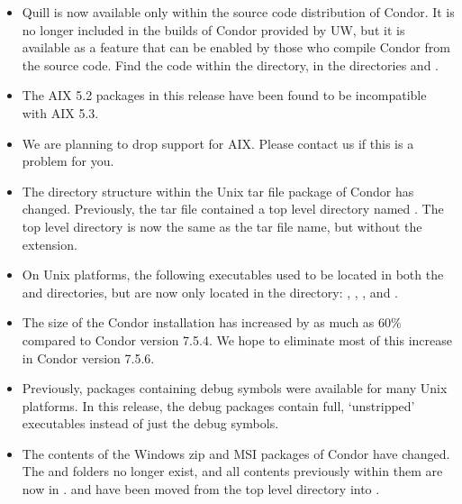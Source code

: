 \begin{itemize}
\item Quill is now available only within the source code distribution 
  of Condor.
  It is no longer included in the builds of Condor provided by UW,
  but it is available as a feature that can be enabled by those who compile
  Condor from the source code.
  Find the code within the  directory, in the
  directories  and . 


\item The AIX 5.2 packages in this release have been found to be
  incompatible with AIX 5.3.

\item We are planning to drop support for AIX.  Please contact us if
  this is a problem for you.

\item The directory structure within the Unix tar file package of Condor
  has changed.  Previously, the tar file contained a top level
  directory named .  The top level
  directory is now the same as the tar file name, but without the
   extension.

\item On Unix platforms, the following executables used to be located in both
  the  and  directories,
  but are now only located in the 
  directory: , , , and
  .

\item The size of the Condor installation has increased by as much as
  60\% compared to Condor version 7.5.4.  We hope to eliminate most of this
  increase in Condor version 7.5.6.

\item Previously, packages containing debug symbols were available for
  many Unix platforms.  In this release, the debug packages contain
  full, `unstripped' executables instead of just the debug symbols.

\item The contents of the Windows zip and MSI packages of Condor have
  changed.  The  and  folders no longer exist,
  and all contents previously within them are now in .
   and  have been moved from the top
  level directory into .


\end{itemize}
